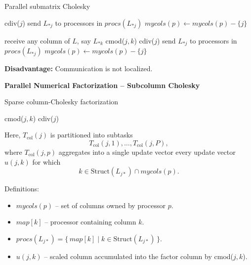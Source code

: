 \documentclass[12pt]{book}
\begin{document}
\begin{algorithm}[H]
\caption{Parallel submatrix Cholesky}
\begin{algorithmic}[1]
        \State cdiv($j$)
        \State send $L_{*j}$ to processors in $procs(L_{*j})$
        \State $mycols(p) \gets mycols(p) - \{j\}$
    \EndIf
\EndFor

    \State receive any column of $L$, say $L_{*k}$
        \State cmod($j,k$)
            \State cdiv($j$)
            \State send $L_{*j}$ to processors in $procs(L_{*j})$
            \State $mycols(p) \gets mycols(p) - \{j\}$
        \EndIf
    \EndFor
\EndWhile
\end{algorithmic}
\end{algorithm}

\noindent\textbf{Disadvantage:} Communication is not localized.


\noindent \textbf{Parallel Numerical Factorization – Subcolumn Cholesky}

\begin{algorithm}[H]
\caption{Sparse column-Cholesky factorization}
\begin{algorithmic}[1]
        \State cmod($j,k$)
    \EndFor
    \State cdiv($j$)
\EndFor
\end{algorithmic}
\end{algorithm}

Here, $T_{\text{col}}(j)$ is partitioned into subtasks
\[
T_{\text{col}}(j,1), \ldots, T_{\text{col}}(j,P),
\]
where $T_{\text{col}}(j,p)$ aggregates into a single update vector every update vector $u(j,k)$ for which
\[
k \in \text{Struct}(L_{j*}) \cap mycols(p).
\]

Definitions:
\begin{itemize}
    \item $mycols(p)$ – set of columns owned by processor $p$.
    \item $map[k]$ – processor containing column $k$.
    \item $procs(L_{j*}) = \{\, map[k] \mid k \in \text{Struct}(L_{j*}) \,\}$.
    \item $u(j,k)$ – scaled column accumulated into the factor column by cmod($j,k$).
\end{itemize}
\end{document}

